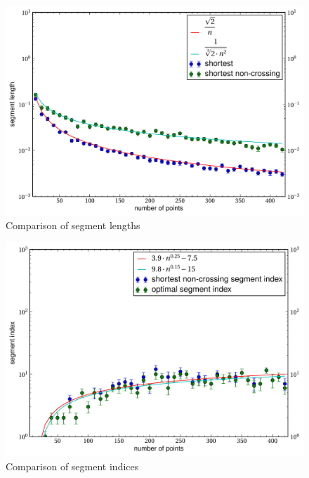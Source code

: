 \begin{landscape}
\begin{figure}[ht]
  \centering
  \includegraphics[width=\linewidth,keepaspectratio]{results/segment_length.pdf}
  \caption{\label{fig:segment_lengths}Comparison of segment lengths}
\end{figure}

\begin{figure}[ht]
  \centering
  \includegraphics[width=\linewidth,keepaspectratio]{results/segment_index.pdf}
  \caption{\label{fig:segment_index}Comparison of segment indices}
\end{figure}
\end{landscape}
\restoregeometry

